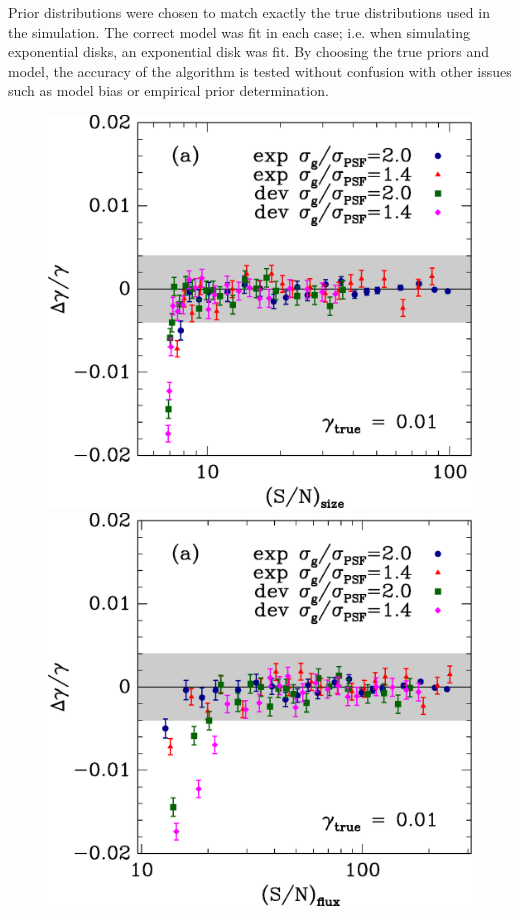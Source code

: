 \documentclass[12pt,preprint]{aastex}
\begin{document}
Prior distributions were chosen to match exactly the true distributions used in
the simulation.  The correct model was fit in each case; i.e. when simulating
exponential disks, an exponential disk was fit.  By choosing the true priors
and model, the accuracy of the algorithm is tested without confusion with other
issues such as model bias or empirical prior determination.

\begin{figure}[p] \centering
 \centering 
 \includegraphics[scale=0.45]{figures/cbafit-geg-T-s2n.eps}
 \includegraphics[scale=0.45]{figures/cbafit-geg-flux-s2n.eps}


\end{figure}
\end{document}
